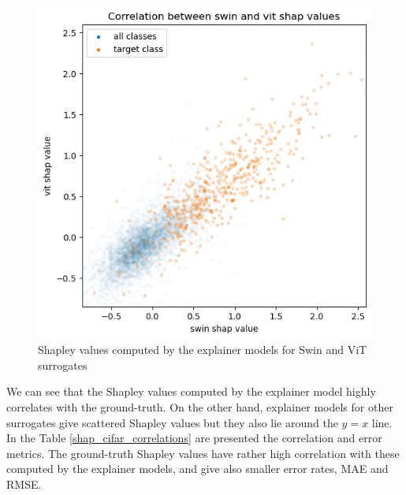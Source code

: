 \documentclass[magisterska,en]{pracamgr}
\begin{document}
\begin{figure}[H]
\centering
\includegraphics[scale=0.5]{./images/swin_vit_cifar.png}
\caption{Shapley values computed by the explainer models for Swin and ViT surrogates}
\label{swin_vit_cifar}
\end{figure}

We can see that the Shapley values computed by the explainer model highly correlates with the ground-truth. On the other hand, explainer models for other surrogates give scattered Shapley values but they also lie around the $y=x$ line. In the Table \ref{shap_cifar_correlations} are presented the correlation and error metrics. The ground-truth Shapley values have rather high correlation with these computed by the explainer models, and give also smaller error rates, MAE and RMSE.
\end{document}
